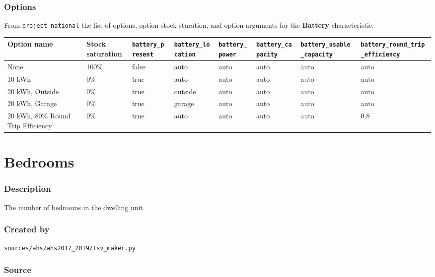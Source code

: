 \subsubsection{Options}\label{options-6}

From \texttt{project\_national} the list of options, option stock
sturation, and option arguments for the \textbf{Battery} characteristic.

\begin{longtable}[]{@{}llllllll@{}}
\toprule\noalign{}
Option name & Stock saturation & \texttt{battery\_present} &
\texttt{battery\_location} & \texttt{battery\_power} &
\texttt{battery\_capacity} & \texttt{battery\_usable\_capacity} &
\texttt{battery\_round\_trip\_efficiency} \\
\midrule\noalign{}
\endhead
\bottomrule\noalign{}
\endlastfoot
None & 100\% & false & auto & auto & auto & auto & auto \\
10 kWh & 0\% & true & auto & auto & auto & auto & auto \\
20 kWh, Outside & 0\% & true & outside & auto & auto & auto & auto \\
20 kWh, Garage & 0\% & true & garage & auto & auto & auto & auto \\
20 kWh, 80\% Round Trip Efficiency & 0\% & true & auto & auto & auto &
auto & 0.8 \\
\end{longtable}

\section{Bedrooms}\label{bedrooms}

\subsubsection{Description}\label{description-7}

The number of bedrooms in the dwelling unit.

\subsubsection{Created by}\label{created-by-7}

\texttt{sources/ahs/ahs2017\_2019/tsv\_maker.py}

\subsubsection{Source}\label{source-7}

